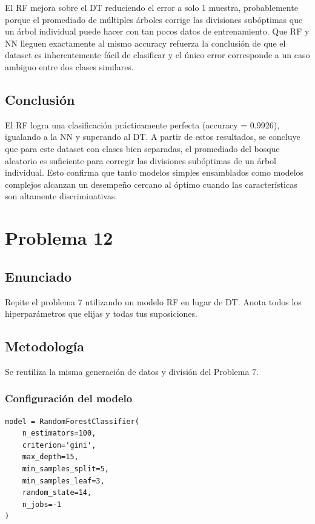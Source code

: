 \documentclass{article}
\begin{document}
El RF mejora sobre el DT reduciendo el error a solo 1 muestra, probablemente porque el promediado de múltiples árboles corrige las divisiones subóptimas que un árbol individual puede hacer con tan pocos datos de entrenamiento. Que RF y NN lleguen exactamente al mismo accuracy refuerza la conclusión de que el dataset es inherentemente fácil de clasificar y el único error corresponde a un caso ambiguo entre dos clases similares.

\subsection{Conclusión}

El RF logra una clasificación prácticamente perfecta (accuracy = 0.9926), igualando a la NN y superando al DT. A partir de estos resultados, se concluye que para este dataset con clases bien separadas, el promediado del bosque aleatorio es suficiente para corregir las divisiones subóptimas de un árbol individual. Esto confirma que tanto modelos simples ensamblados como modelos complejos alcanzan un desempeño cercano al óptimo cuando las características son altamente discriminativas.

\section{Problema 12}

\subsection{Enunciado}

Repite el problema 7 utilizando un modelo RF en lugar de DT. Anota todos los hiperparámetros que elijas y todas tus suposiciones.

\subsection{Metodología}

Se reutiliza la misma generación de datos y división del Problema 7.

\subsubsection{Configuración del modelo}

\begin{lstlisting}
model = RandomForestClassifier(
    n_estimators=100,
    criterion='gini',
    max_depth=15,
    min_samples_split=5,
    min_samples_leaf=3,
    random_state=14,
    n_jobs=-1
)
\end{lstlisting}
\end{document}
